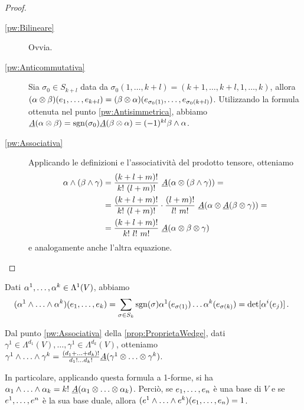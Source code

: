 \begin{proof}
\begin{description}
	\item [\ref{pw:Bilineare}] Ovvia.

	\item [\ref{pw:Anticommutativa}]
	Sia $\sigma_0\in S_{k+l}$ data da $\sigma_0(1,\ldots,k+l) = (k+1,\ldots,k+l,1,\ldots,k)$, allora $(\alpha\otimes \beta)(\seqb{e}{k+l}{,}) = (\beta\otimes \alpha)(e_{\sigma_0(1)},\ldots,e_{\sigma_0(k+l)})$.
	Utilizzando la formula ottenuta nel punto \ref{pw:Antisimmetrica}, abbiamo $\antisimm(\alpha\otimes\beta) = \sgn(\sigma_0) \antisimm(\beta\otimes\alpha)=(-1)^{kl} \beta \wedge \alpha$.

	\item [\ref{pw:Associativa}]
	Applicando le definizioni e l'associatività del prodotto tensore, otteniamo
	\begin{align*}
	\alpha\wedge(\beta\wedge\gamma) &= \frac{(k+l+m)!}{k!\ (l+m)!}\ \antisimm(\alpha\otimes(\beta\wedge\gamma)) =\\
	&=\frac{(k+l+m)!}{k!\ (l+m)!}\cdot \frac{(l+m)!}{l!\ m!}\ \antisimm(\alpha\otimes\antisimm(\beta\otimes\gamma))=\\
	&=\frac{(k+l+m)!}{k!\ l!\ m!}\ \antisimm(\alpha\otimes\beta\otimes\gamma)
	\end{align*}
	e analogamente anche l'altra equazione.

	\end{description}
\end{proof}


\begin{remark}
	Dati $\seqa{\alpha}{k}{,}\in\Lambda^1(V)$, abbiamo
	\begin{equation*}
		(\seqa{\alpha}{k}{\wedge})(\seqb{e}{k}{,}) = \sum_{\sigma\in S_k} \sgn(\sigma) \alpha^1(e_{\sigma(1)}) \ldots \alpha^k(e_{\sigma(k)}) = \det[\alpha^i(e_j)] \punto
	\end{equation*}
\end{remark}
\begin{remark}
	Dal punto \ref{pw:Associativa} della \cref{prop:ProprietaWedge}, dati $\gamma^1\in \Lambda^{d_1}(V),\ldots, \gamma^1\in \Lambda^{d_k}(V)$, otteniamo $\seqa{\gamma}{k}{\wedge} = \frac{(\seqb{d}{k}{+})!}{d_1!\ldots d_k!}\antisimm (\seqa{\gamma}{k}{\otimes})$.
	
	In particolare, applicando questa formula a 1-forme, si ha $\seqb{\alpha}{k}{\wedge} = k!\ \antisimm(\seqb{\alpha}{k}{\otimes})$.
	Perciò, se $\seqb en,$ è una base di $V$ e se $\seqa en,$ è la sua base duale, allora $(\seqa ek\wedge)(\seqb en,) = 1$.

\end{remark}

